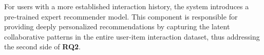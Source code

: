 For users with a more established interaction history, the system introduces a pre-trained expert recommender model. This component is responsible for providing deeply personalized recommendations by capturing the latent collaborative patterns in the entire user-item interaction dataset, thus addressing the second side of \textbf{RQ2}.